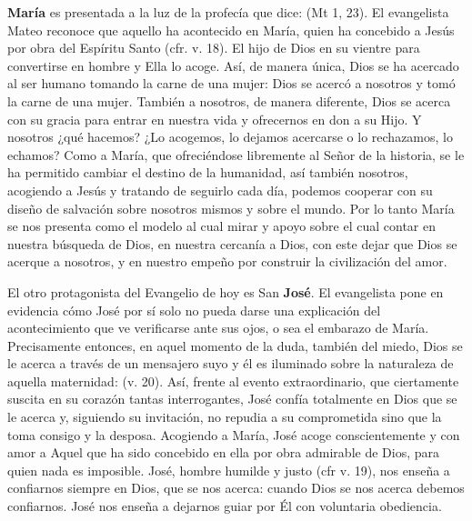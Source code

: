 \begin{body}
\begin{body}
\textbf{María} es presentada a la luz de la profecía que dice:  (Mt 1, 23). El evangelista Mateo reconoce que aquello ha acontecido en María, quien ha concebido a Jesús por obra del Espíritu Santo (cfr. v. 18). El hijo de Dios  en su vientre para convertirse en hombre y Ella lo acoge. Así, de manera única, Dios se ha acercado al ser humano tomando la carne de una mujer: Dios se acercó a nosotros y tomó la carne de una mujer. También a nosotros, de manera diferente, Dios se acerca con su gracia para entrar en nuestra vida y ofrecernos en don a su Hijo. Y nosotros ¿qué hacemos? ¿Lo acogemos, lo dejamos acercarse o lo rechazamos, lo echamos? Como a María, que ofreciéndose libremente al Señor de la historia, se le ha permitido cambiar el destino de la humanidad, así también nosotros, acogiendo a Jesús y tratando de seguirlo cada día, podemos cooperar con su diseño de salvación sobre nosotros mismos y sobre el mundo. Por lo tanto María se nos presenta como el modelo al cual mirar y apoyo sobre el cual contar en nuestra búsqueda de Dios, en nuestra cercanía a Dios, con este dejar que Dios se acerque a nosotros, y en nuestro empeño por construir la civilización del amor.

El otro protagonista del Evangelio de hoy es San \textbf{José}. El evangelista pone en evidencia cómo José por sí solo no pueda darse una explicación del acontecimiento que ve verificarse ante sus ojos, o sea el embarazo de María. Precisamente entonces, en aquel momento de la duda, también del miedo, Dios se le acerca a través de un mensajero suyo y él es iluminado sobre la naturaleza de aquella maternidad:  (v. 20). Así, frente al evento extraordinario, que ciertamente suscita en su corazón tantas interrogantes, José confía totalmente en Dios que se le acerca y, siguiendo su invitación, no repudia a su comprometida sino que la toma consigo y la desposa. Acogiendo a María, José acoge conscientemente y con amor a Aquel que ha sido concebido en ella por obra admirable de Dios, para quien nada es imposible. José, hombre humilde y justo (cfr v. 19), nos enseña a confiarnos siempre en Dios, que se nos acerca: cuando Dios se nos acerca debemos confiarnos. José nos enseña a dejarnos guiar por Él con voluntaria obediencia.


\end{body}
\end{body}
